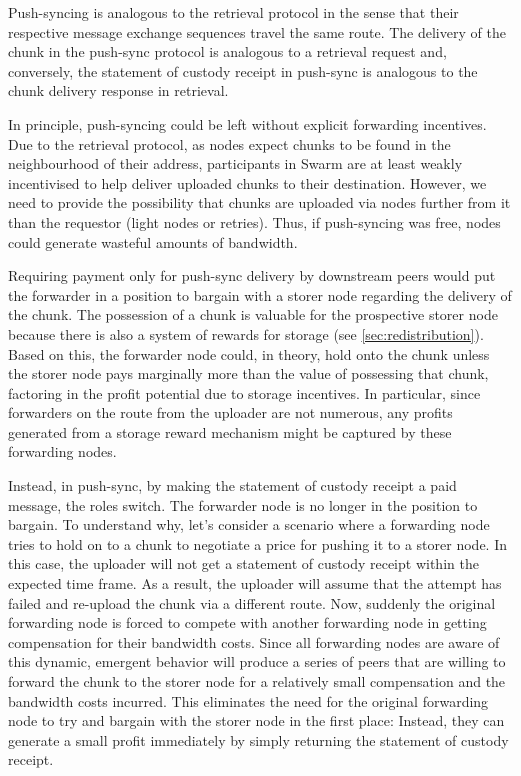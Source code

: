 Push-syncing is analogous to the retrieval protocol in the sense that their respective message exchange sequences travel the same route.
The delivery of the chunk in the push-sync protocol is analogous to a retrieval request and, conversely, the statement of custody receipt in push-sync is analogous to the chunk delivery response in retrieval.

In principle, push-syncing could be left without explicit forwarding incentives. Due to the retrieval protocol, as nodes expect chunks to be found in the neighbourhood of their address, participants in Swarm are at least weakly incentivised to help deliver uploaded chunks to their destination. However, we  need to provide the possibility that chunks are uploaded via nodes further from it than the requestor (light  nodes or retries). Thus, if push-syncing was free, nodes could generate wasteful amounts of bandwidth. 

Requiring payment only for push-sync delivery by downstream peers would put the forwarder in a position to bargain with a storer node regarding the delivery of the chunk. The possession of a chunk is valuable for the prospective storer node because there is also a system of rewards for storage (see \ref{sec:redistribution}). Based on this, the forwarder node could, in theory, hold onto the chunk unless the storer node pays marginally more than the value of possessing that chunk, factoring in the profit potential due to storage incentives. In particular, since forwarders on the route from the uploader are not numerous, any profits generated from a storage reward mechanism might be captured by these forwarding nodes.

Instead, in push-sync, by making the statement of custody receipt a paid message, the roles switch. The forwarder node is no longer in the position to bargain. To understand why, let's consider a scenario where a forwarding node tries to hold on to a chunk to negotiate a price for pushing it to a storer node. In this case, the uploader will not get a statement of custody receipt within the expected time frame. As a result, the uploader will assume that the attempt has failed and re-upload the chunk via a different route. Now, suddenly the original forwarding node is forced to compete with another forwarding node in getting compensation for their bandwidth costs. Since all forwarding nodes are aware of this dynamic, emergent behavior will produce a series of peers that are willing to forward the chunk to the storer node for a relatively small compensation and the bandwidth costs incurred. This eliminates the need for the original forwarding node to try and bargain with the storer node in the first place: Instead, they can generate a small profit immediately by simply returning the statement of custody receipt. 


